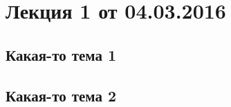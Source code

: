 



\section*{Лекция 1 от 04.03.2016}

\subsection*{Какая-то тема 1}

\subsection*{Какая-то тема 2}

